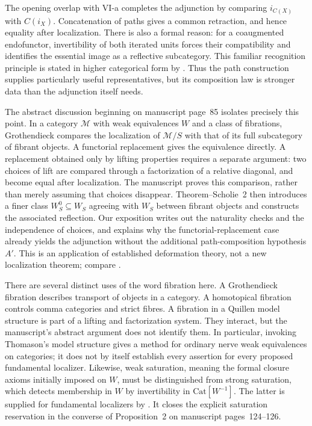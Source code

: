 The opening overlap with VI-a completes the adjunction by comparing $i_{C(X)}$ with $C(i_X)$. Concatenation of paths gives a common retraction, and hence equality after localization. There is also a formal reason: for a coaugmented endofunctor, invertibility of both iterated units forces their compatibility and identifies the essential image as a reflective subcategory. This familiar recognition principle is stated in higher categorical form by \citet[Proposition~5.2.7.4]{Lurie2009HTT}. Thus the path construction supplies particularly useful representatives, but its composition law is stronger data than the adjunction itself needs.

The abstract discussion beginning on manuscript page~85 isolates precisely this point. In a category $\mathcal M$ with weak equivalences $W$ and a class of fibrations, Grothendieck compares the localization of $\mathcal M/S$ with that of its full subcategory of fibrant objects. A functorial replacement gives the equivalence directly. A replacement obtained only by lifting properties requires a separate argument: two choices of lift are compared through a factorization of a relative diagonal, and become equal after localization. The manuscript proves this comparison, rather than merely assuming that choices disappear. Theorem--Scholie~2 then introduces a finer class $W_S^0\subseteq W_S$ agreeing with $W_S$ between fibrant objects and constructs the associated reflection. Our exposition writes out the naturality checks and the independence of choices, and explains why the functorial-replacement case already yields the adjunction without the additional path-composition hypothesis $A'$. This is an application of established deformation theory, not a new localization theorem; compare \citet[Theorem~2.2.11]{Riehl2014}.

There are several distinct uses of the word fibration here. A Grothendieck fibration describes transport of objects in a category. A homotopical fibration controls comma categories and strict fibres. A fibration in a Quillen model structure is part of a lifting and factorization system. They interact, but the manuscript's abstract argument does not identify them. In particular, invoking Thomason's model structure gives a method for ordinary nerve weak equivalences on categories; it does not by itself establish every assertion for every proposed fundamental localizer. Likewise, weak saturation, meaning the formal closure axioms initially imposed on $W$, must be distinguished from strong saturation, which detects membership in $W$ by invertibility in $\mathrm{Cat}[W^{-1}]$. The latter is supplied for fundamental localizers by \citet[Proposition~4.2.4 in the cited author version]{Cisinski2006Presheaves}. It closes the explicit saturation reservation in the converse of Proposition~2 on manuscript pages~124--126.

